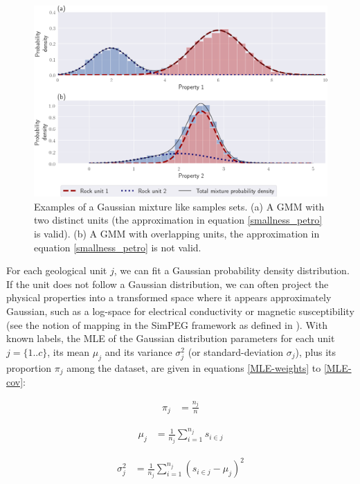 \documentclass[extra]{gji} %
\begin{document}
\begin{figure}
\centering
\includegraphics[width=\columnwidth]{./Fig/LowRes/GaussianMixture_1D.png}
\caption{Examples of a Gaussian mixture like samples sets. (a) A GMM with two distinct units (the approximation in equation \ref{smallness_petro} is valid). (b) A GMM with overlapping units, the approximation in equation \ref{smallness_petro} is not valid.}
\label{GaussianMixture}
\end{figure}

For each geological unit $j$, we can fit a Gaussian probability density distribution. If the unit does not follow a Gaussian distribution, we can often project the physical properties into a transformed space where it appears approximately Gaussian, such as a log-space for electrical conductivity or magnetic susceptibility (see the notion of mapping in the SimPEG framework as defined in \cite{Cockett2015,SeogiMapping}). With known labels, the MLE of the Gaussian distribution parameters for each unit $j=\{1..c\}$, its mean $\mu_j$ and its variance $\sigma_j^2$ (or standard-deviation $\sigma_j$), plus its proportion $\pi_j$ among the dataset, are given in equations \ref{MLE-weights} to \ref{MLE-cov}:

\begin{align}
\pi_j &= \frac{n_j}{n}
\label{MLE-weights}
\end{align}

\begin{align}
{\mu}_j &= \frac{1}{n_j}\sum_{i=1}^{n_j}{s}_{i \in j}
\label{MLE-means}
\end{align}

\begin{align}
\sigma_j^2 & = \frac{1}{n_j}\sum_{i=1}^{n_j}({s}_{i \in j}-{\mu}_j)^2
\label{MLE-cov}
\end{align}
\end{document}
